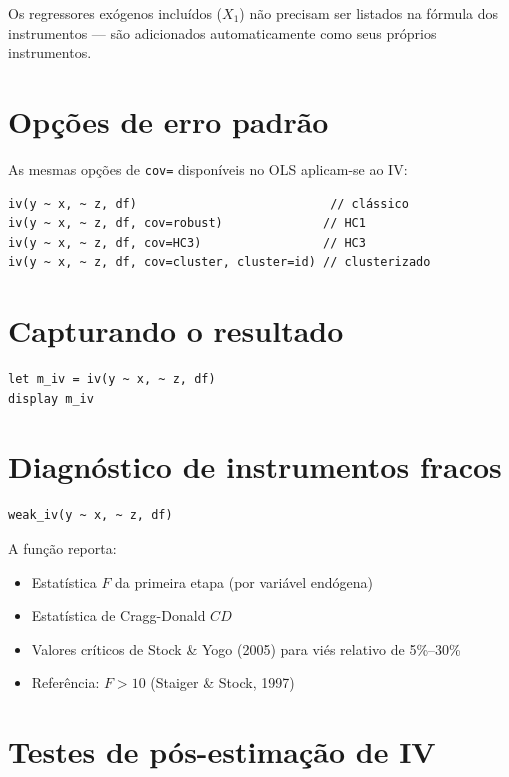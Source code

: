 \begin{nota}
  Os regressores exógenos incluídos ($X_1$) não precisam ser listados na
  fórmula dos instrumentos — são adicionados automaticamente como seus
  próprios instrumentos.
\end{nota}

\section{Opções de erro padrão}

As mesmas opções de \lstinline{cov=} disponíveis no OLS aplicam-se ao IV:

\begin{lstlisting}
iv(y ~ x, ~ z, df)                           // clássico
iv(y ~ x, ~ z, df, cov=robust)              // HC1
iv(y ~ x, ~ z, df, cov=HC3)                 // HC3
iv(y ~ x, ~ z, df, cov=cluster, cluster=id) // clusterizado
\end{lstlisting}

\section{Capturando o resultado}

\begin{lstlisting}
let m_iv = iv(y ~ x, ~ z, df)
display m_iv
\end{lstlisting}

\section{Diagnóstico de instrumentos fracos}

\begin{lstlisting}[caption={Teste de instrumentos fracos}]
weak_iv(y ~ x, ~ z, df)
\end{lstlisting}

A função reporta:
\begin{itemize}
  \item Estatística $F$ da primeira etapa (por variável endógena)
  \item Estatística de Cragg-Donald $CD$
  \item Valores críticos de Stock \& Yogo (2005) para viés relativo de 5\%--30\%
  \item Referência: $F > 10$ (Staiger \& Stock, 1997)
\end{itemize}

\section{Testes de pós-estimação de IV}

